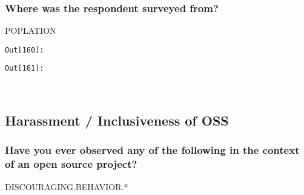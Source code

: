 \documentclass[11pt]{article}
\begin{document}
    \subsubsection{Where was the respondent surveyed
from?}\label{where-was-the-respondent-surveyed-from}

POPLATION

\texttt{\color{outcolor}Out[{\color{outcolor}160}]:}
    

    

\texttt{\color{outcolor}Out[{\color{outcolor}161}]:}
    

    


    \begin{center}
    \end{center}
    { \hspace*{\fill} \\}
    
    \subsection{Harassment / Inclusiveness of
OSS}\label{harassment-inclusiveness-of-oss}

    \subsubsection{Have you ever observed any of the following in the
context of an open source
project?}\label{have-you-ever-observed-any-of-the-following-in-the-context-of-an-open-source-project}

DISCOURAGING.BEHAVIOR.*
\end{document}
